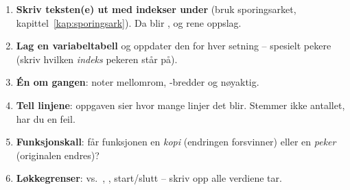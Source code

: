 
\label{kap:oppgave1}

\begin{regel}
\begin{enumerate}
  \item \textbf{Skriv teksten(e) ut med indekser under} (bruk sporingsarket, kapittel~\ref{kap:sporingsark}). Da blir ,  og  rene oppslag.
  \item \textbf{Lag en variabeltabell} og oppdater den for hver setning -- spesielt pekere (skriv hvilken \emph{indeks} pekeren står på).
  \item \textbf{Én  om gangen}: noter mellomrom, -bredder og  nøyaktig.
  \item \textbf{Tell linjene}: oppgaven sier hvor mange linjer det blir. Stemmer ikke antallet, har du en feil.
  \item \textbf{Funksjonskall}: får funksjonen en \emph{kopi} (endringen forsvinner) eller en \emph{peker} (originalen endres)?
  \item \textbf{Løkkegrenser}: \cc{<} vs.\ \cc{<=}, , start/slutt -- skriv opp alle verdiene  tar.
\end{enumerate}
\end{regel}

